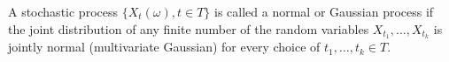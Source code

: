 A stochastic process $\{X_t(\omega), t \in T\}$ is called a normal or Gaussian process if the joint distribution of any finite number of the random variables $X_{t_1}, \ldots, X_{t_k}$ is jointly normal (multivariate Gaussian) for every choice of $t_1, \ldots, t_k \in T$.
